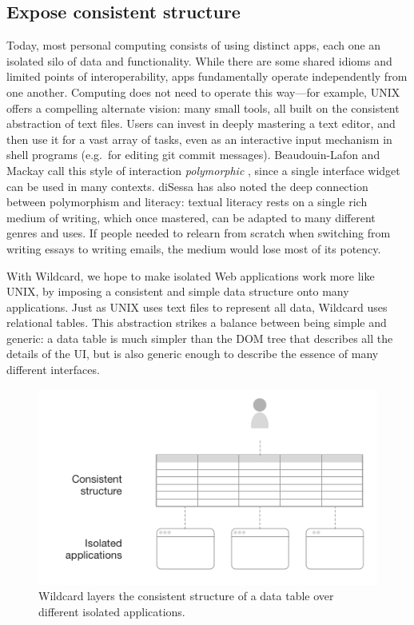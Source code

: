 \documentclass[english,submission]{programming}
\begin{document}
\hypertarget{expose-consistent-structure}{%
\subsection{Expose consistent
structure}\label{expose-consistent-structure}}

Today, most personal computing consists of using distinct apps, each one
an isolated silo of data and functionality. While there are some shared
idioms and limited points of interoperability, apps fundamentally
operate independently from one another. Computing does not need to
operate this way---for example, UNIX offers a compelling alternate
vision: many small tools, all built on the consistent abstraction of
text files. Users can invest in deeply mastering a text editor, and then
use it for a vast array of tasks, even as an interactive input mechanism
in shell programs (e.g.~for editing git commit messages).
Beaudouin-Lafon and Mackay call this style of interaction
\emph{polymorphic} \autocite{beaudouin-lafon2000}, since a single
interface widget can be used in many contexts. diSessa
\autocite{disessa2000} has also noted the deep connection between
polymorphism and literacy: textual literacy rests on a single rich
medium of writing, which once mastered, can be adapted to many different
genres and uses. If people needed to relearn from scratch when switching
from writing essays to writing emails, the medium would lose most of its
potency.

With Wildcard, we hope to make isolated Web applications work more like
UNIX, by imposing a consistent and simple data structure onto many
applications. Just as UNIX uses text files to represent all data,
Wildcard uses relational tables. This abstraction strikes a balance
between being simple and generic: a data table is much simpler than the
DOM tree that describes all the details of the UI, but is also generic
enough to describe the essence of many different interfaces.

\begin{figure}
\centering
\includegraphics{media/structure.png}
\caption{Wildcard layers the consistent structure of a data table over
different isolated applications.}
\end{figure}
\end{document}
